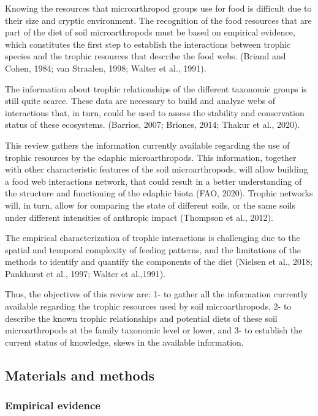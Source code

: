 \documentclass[11pt]{article}
\begin{document}
Knowing the resources that microarthropod groups use for food is
difficult due to their size and cryptic environment. The recognition of
the food resources that are part of the diet of soil microarthropods
must be based on empirical evidence, which constitutes the first step to
establish the interactions between trophic species and the trophic
resources that describe the food webs. (Briand and Cohen, 1984; van
Straalen, 1998; Walter et al., 1991).

The information about trophic relationships of the different taxonomic
groups is still quite scarce. These data are necessary to build and
analyze webs of interactions that, in turn, could be used to assess the
stability and conservation status of these ecosystems. (Barrios, 2007;
Briones, 2014; Thakur et al., 2020).

This review gathers the information currently available regarding the
use of trophic resources by the edaphic microarthropods. This
information, together with other characteristic features of the soil
microarthropods, will allow building a food web interactions network,
that could result in a better understanding of the structure and
functioning of the edaphic biota (FAO, 2020). Trophic networks will, in
turn, allow for comparing the state of different soils, or the same
soils under different intensities of anthropic impact (Thompson et al.,
2012).

The empirical characterization of trophic interactions is challenging
due to the spatial and temporal complexity of feeding patterns, and the
limitations of the methods to identify and quantify the components of
the diet (Nielsen et al., 2018; Pankhurst et al., 1997; Walter et
al.,1991).

Thus, the objectives of this review are: 1- to gather all the
information currently available regarding the trophic resources used by
soil microarthropods, 2- to describe the known trophic relationships and
potential diets of these soil microarthropods at the family taxonomic
level or lower, and 3- to establish the current status of knowledge,
skews in the available information.

\hypertarget{materials-and-methods}{%
\subsection{Materials and methods}\label{materials-and-methods}}

\hypertarget{empirical-evidence}{%
\subsubsection{Empirical evidence}\label{empirical-evidence}}
\end{document}
